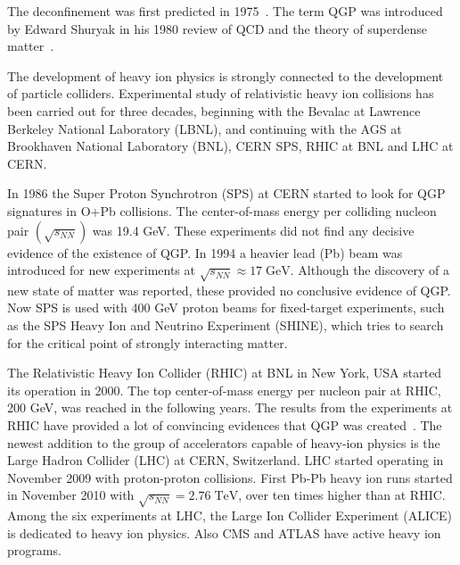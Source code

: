 The deconfinement was first predicted in 1975~\cite{Collins:1975}. The term QGP was introduced by Edward Shuryak in his 1980 review of QCD and the theory of superdense matter~\cite{Shuryak:1980}.

The development of heavy ion physics is strongly connected to the development of particle colliders.  
Experimental study of relativistic heavy ion collisions has been carried out for three decades, beginning with the Bevalac at Lawrence Berkeley National Laboratory (LBNL), and continuing with the AGS at Brookhaven National Laboratory (BNL), CERN SPS, RHIC at BNL and LHC at CERN.

In 1986 the Super Proton Synchrotron (SPS) at CERN started to look for QGP signatures in O+Pb collisions. The center-of-mass energy per colliding nucleon pair $\left(\sqrt{s_{NN}}\right)$ was 19.4 GeV. These experiments did not find any decisive evidence of the existence of QGP. In 1994 a heavier lead (Pb) beam was introduced for new experiments at $\sqrt{s_{NN}}\approx 17\; \mathrm{GeV}$. Although the discovery of a new state of matter was reported, these provided no conclusive evidence of QGP. Now SPS is used with 400 GeV proton beams for fixed-target experiments, such as the SPS Heavy Ion and Neutrino Experiment (SHINE), which tries to search for the critical point of strongly interacting matter.

The Relativistic Heavy Ion Collider (RHIC) at BNL in New York, USA started its  operation in 2000. The top center-of-mass energy per nucleon pair at RHIC, 200 GeV, was reached in the following years. The results from the experiments at RHIC have provided a lot of convincing evidences that QGP was created~\cite{Adcox:2004mh, Adams:2005dq, Arsene:2004fa, Back:2004je}. The newest addition to the group of accelerators capable of heavy-ion physics is the Large Hadron Collider (LHC) at CERN, Switzerland. LHC started operating in November 2009 with proton-proton collisions. First Pb-Pb heavy ion runs started in November 2010 with $\sqrt{s_{NN}}=2.76\; \mathrm{TeV}$,  over ten times higher than at RHIC. Among the six experiments at LHC, the Large Ion Collider Experiment (ALICE) is dedicated to heavy ion physics. Also CMS and ATLAS have active heavy ion programs. 

